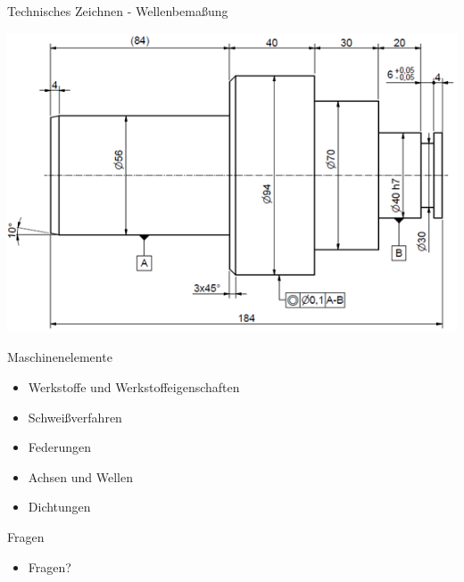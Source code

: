 \documentclass[11pt]{beamer}
\begin{document}





\begin{frame}{Technisches Zeichnen - Wellenbemaßung}

\begin{center}
\includegraphics[scale=0.5]{welle.png}
\end{center}

	
\end{frame}











\begin{frame}{Maschinenelemente}
	
\begin{itemize}
\item Werkstoffe und Werkstoffeigenschaften
\item Schweißverfahren
\item Federungen
\item Achsen und Wellen
\item Dichtungen
\end{itemize}
	
	
\end{frame}





\begin{frame}{Fragen}
	
\begin{itemize}
\item Fragen?
\end{itemize}
	
	
\end{frame}
\end{document}
